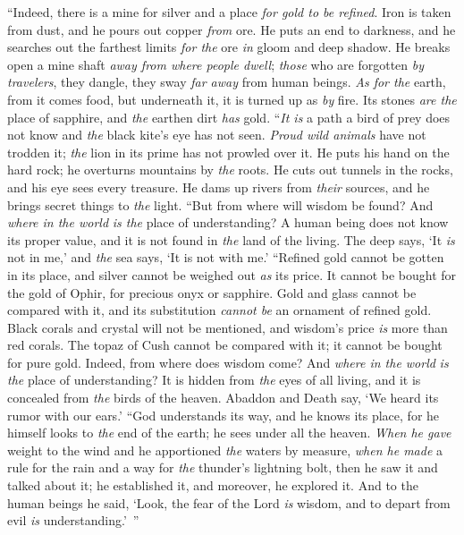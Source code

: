 \begin{biblechapter} %
 “Indeed, there is a mine for silver 
and a place \textit{for gold to be refined}.
\verse Iron is taken from dust, 
and he pours out copper \textit{from} ore.
\verse He puts an end to darkness, 
and he searches out the farthest limits 
\textit{for the} ore \textit{in} gloom and deep shadow.
\verse He breaks open a mine shaft \textit{away from where people dwell}; 
\textit{those} who are forgotten \textit{by travelers}, 
they dangle, they sway \textit{far away} from human beings.
\verse \textit{As for the} earth, from it comes food, 
but underneath it, it is turned up as \textit{by} fire.
\verse Its stones \textit{are the} place of sapphire, 
and \textit{the} earthen dirt \textit{has} gold.
\verse “\textit{It is} a path a bird of prey does not know 
and \textit{the} black kite’s eye has not seen.
\verse \textit{Proud wild animals} have not trodden it; 
\textit{the} lion in its prime has not prowled over it.
\verse He puts his hand on the hard rock; 
he overturns mountains by \textit{the} roots.
\verse He cuts out tunnels in the rocks, 
and his eye sees every treasure.
\verse He dams up rivers from \textit{their} sources, 
and he brings secret things to \textit{the} light.
\verse “But from where will wisdom be found? 
And \textit{where in the world} \textit{is the} place of understanding?
\verse A human being does not know its proper value, 
and it is not found in \textit{the} land of the living.
\verse The deep says, ‘It \textit{is} not in me,’ 
and \textit{the} sea says, ‘It is not with me.’
\verse “Refined gold cannot be gotten in its place, 
and silver cannot be weighed out \textit{as} its price.
\verse It cannot be bought for the gold of Ophir, 
for precious onyx or sapphire.
\verse Gold and glass cannot be compared with it, 
and its substitution \textit{cannot be} an ornament of refined gold.
\verse Black corals and crystal will not be mentioned, 
and wisdom’s price \textit{is} more than red corals.
\verse The topaz of Cush cannot be compared with it; 
it cannot be bought for pure gold.
\verse Indeed, from where does wisdom come? 
And \textit{where in the world} \textit{is the} place of understanding?
\verse It is hidden from \textit{the} eyes of all living, 
and it is concealed from \textit{the} birds of the heaven.
\verse Abaddon and Death say, 
‘We heard its rumor with our ears.’
\verse “God understands its way, 
and he knows its place,
\verse for he himself looks to \textit{the} end of the earth; 
he sees under all the heaven.
\verse \textit{When he gave} weight to the wind 
and he apportioned \textit{the} waters by measure,
\verse \textit{when he made} a rule for the rain 
and a way for \textit{the} thunder’s lightning bolt,
\verse then he saw it and talked about it; 
he established it, and moreover, he explored it.
\verse And to the human beings he said, 
‘Look, the fear of the Lord \textit{is} wisdom, 
and to depart from evil \textit{is} understanding.’ ”
\end{biblechapter}

